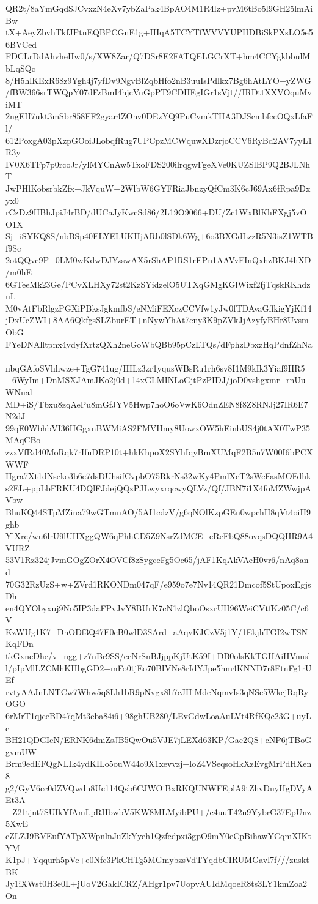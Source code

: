 QR2t/8aYmGqdSJCvxzN4eXv7ybZaPak4BpAO4M1R4lz+pvM6tBo5l9GH25lmAiBw
tX+AeyZbvhTkfJPtnEQBPCGnE1g+IHqA5TCYTfWVVYUPHDBiSkPXsLO5e56BVCed
FDCLrDdAhvheHw0/s/XW8Zar/Q7DSr8E2FATQELGCrXT+hm4CCYgkbbulMbLqSQc
8/H5hlKExR68z9Ygh4j7yfDv9NgvBlZqbHfo2nB3uuIsPdlkx7Bg6hAtLYO+yZWG
/fBW366srTWQpY07dFzBmI4hjcVnGpPT9CDHEgIGr1sVjt//IRDttXXVOquMviMT
2ngEH7ukt3mSbr858FF2gyar4ZOnv0DEzYQ9PuCvmkTHA3DJScmbfccOQxLfaFl/
612PoxgA03pXzpGOoiJLobqfRug7UPCpzMCWquwXDzrjoCCV6RyBd2AV7yyL1R3y
IV0X6TFp7p0rcoJr/ylMYCnAw5TxoFDS200ilrqgwFgeXVe0KUZSlBP9Q2BJLNhT
JwPHlKobsrbkZfx+JkVquW+2WlbW6GYFRiaJbnzyQfCm3K6cJ69Ax6fRpa9Dxyx0
rCzDz9HBhJpiJ4rBD/dUCaJyKwcSd86/2L19O9066+DU/Zc1WxBlKhFXgj5vOO1X
Sj+iSYKQ8S/nbBSp40ELYELUKHjARb0lSDk6Wg+6o3BXGdLzzR5N3isZ1WTBf9Sc
2otQQvc9P+0LM0wKdwDJYzswAX5rShAP1RS1rEPn1AAVvFInQxhzBKJ4hXD/m0hE
6GTeeMk23Ge/PCvXLHXy72st2KzSYidzelO5UTXqGMgKGlWixf2fjTqskRKhdzuL
M0vAtFbRlgzPGXiPBksJgkmfbS/eNMiFEXczCCVfw1yJw0fTDAvaGflkigYjKf14
jDxUcZWI+8AA6QkfgsSLZburET+nNywYhAt7eny3K9pZVkJjAzyfyBHr8UvsmObG
FYeDNAlltpnx4ydyfXrtzQXh2neGoWbQBb95pCzLTQs/dFphzDbxzHqPdnfZhNa+
nbqGAfoSVhhwze+TgG741ug/IHLz3zr1yqusWBsRu1rh6sv8I1M9kIk3Yiaf9HR5
+6WyIm+DnMSXJAmJKo2j0d+14xGLMINLoGjtPzPIDJ/joD0vshgxmr+rnUuWNual
MD+iS/Tbxu8zqAePu8mGfJYV5Hwp7hoO6oVwK6OdnZEN8f8Z8RNJj27IR6E7N2dJ
99qE0WbhbVI36HGgxnBWMiAS2FMVHmy8UowxOW5hEinbUS4j0tAX0TwP35MAqCBo
zzxVfRd40MoRqk7rIfuDRP10t+hkKhpoX2SYhIqyBmXUMqF2B5u7W00I6bPCXWWF
Hgra7Xt1dNseko3b6e7dsDUhsifCvpbO75RkrNs32wKy4PmlXeT2sWcFasMOFdhk
s2EL+ppLbFRKU4DQlFJdejQQzPJLwyxrqcwyQLVz/Qf/JBN7i1X4foMZWwjpAVbw
BhuKQ44STpMZina79wGTmnAO/5AI1cdzV/g6qNOlKzpGEn0wpchH8qVt4oiH9ghb
YlXrc/wu6lrU9lUHXggQW6qPhhCD5Z9NsrZdMCE+eReFbQ88ovqsDQQHR9A4VURZ
53V1Rz324jJvmGOgZOrX4OVCf8zSygceFg5Oc65/jAF1KqAkVAeH0vr6/nAq8and
70G32RzUzS+w+ZVrd1RKONDm047qF/e959o7e7Nv14QR21Dmcof5StUpoxEgjsDh
en4QYObyxuj9No5IP3daFPvJvY8BUrK7cN1zlQboOsxrUH96WeiCVtfKz05C/c6V
KzWUg1K7+DnODf3Q47E0cB0wlD3SArd+aAqvKJCzV5j1Y/1EkjhTGI2wTSNKqFDn
tkGxncDhe/v+ngg+z7nBr9SS/ecNrSnBJjppKjUtK59I+DB0olsKkTGHAiHVnusl
l/pIpMlLZCMhKHbgGD2+mFo0tjEo70BIVNe8rIdYJpe5hm4KNND7r8FtnFg1rUEf
rvtyAAJnLNTCw7Whw5q8Lh1bR9pNvgx8h7cJHiMdeNqmvIs3qNSc5WkcjRqRyOGO
6rMrT1qjceBD47qMt3eba84i6+98ghUB280/LEvGdwLoaAuLVt4RfKQc23G+uyLc
BH21QDGIcN/ERNK6dniZsJB5QwOu5VJE7jLEXd63KP/Gac2QS+cNP6jTBoGgvmUW
Brm9edEFQgNLIk4ydKILo5ouW44o9X1xevvzj+loZ4VSeqsoHkXzEvgMrPdHXen8
g2/GyV6cc0dZVQwdu8Uc114Qsb6CJWOiBxRKQUNWFEplA9tZhvDuyIIgDVyAEt3A
+Z21tjnt7SUIkYfAmLpRHbwbV5KW8MLMyibPU+/c4uuT42u9YybrG37EpUnz5XwE
cZLZJ9BVEufYATpXWpnlnJuZkYyeh1Qzfcdpxi3gpO9mY0eCpBihawYCqmXIKtYM
K1pJ+Yqqurh5pVc+e0Nfc3PkCHTg5MGmybzsVdTYqdbCIRUMGavl7f///zusktBK
Jy1iXWst0H3e0L+jUoV2GakICRZ/AHgr1pv7UopvAUIdMqoeR8ts3LY1kmZoa2On

